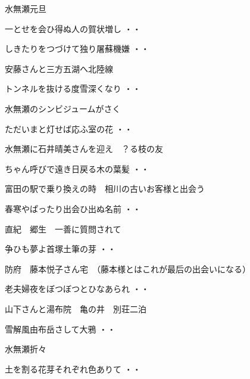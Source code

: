 \vspace{0.6cm}
水無瀬元旦
\begin{shiika}一とせを会ひ得ぬ人の賀状増し
\hfill{・・}\end{shiika}
\begin{shiika}しきたりをつづけて独り屠蘇機嫌
\hfill{・・}\end{shiika}
\vspace{0.6cm}
安藤さんと三方五湖へ北陸線
\begin{shiika}トンネルを抜ける度雪深くなり
\hfill{・・}\end{shiika}
\vspace{0.6cm}
水無瀬のシンビジュームがさく
\begin{shiika}ただいまと灯せば応ふ室の花
\hfill{・・}\end{shiika}
\vspace{0.6cm}
水無瀬に石井晴美さんを迎え　？る枝の友
\begin{shiika}ちゃん呼びで遠き日戻る木の葉髪
\hfill{・・}\end{shiika}
\vspace{0.6cm}
富田の駅で乗り換えの時　相川の古いお客様と出会う
\begin{shiika}春寒やぱったり出会ひ出ぬ名前
\hfill{・・}\end{shiika}
\vspace{0.6cm}
直紀　郷生　一善に質問されて
\begin{shiika}争ひも夢よ首塚土筆の芽
\hfill{・・}\end{shiika}
\vspace{0.6cm}
防府　藤本悦子さん宅　（藤本様とはこれが最后の出会いになる）
\begin{shiika}老夫婦夜をぼつぼつとひなあられ
\hfill{・・}\end{shiika}
\vspace{0.6cm}
山下さんと湯布院　亀の井　別荘二泊
\begin{shiika}雪解風由布岳さして大鴉
\hfill{・・}\end{shiika}
\vspace{0.6cm}
水無瀬折々
\begin{shiika}土を割る花芽それぞれ色ありて
\hfill{・・}\end{shiika}
